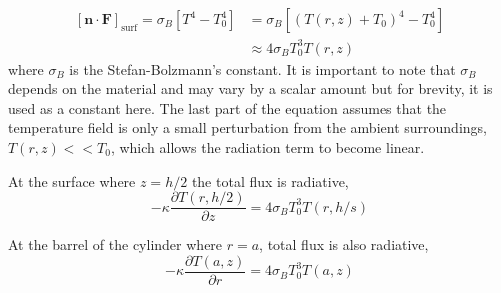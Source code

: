 	\begin{equation}\label{eq:heat_flux}
	\begin{aligned}
	[\textbf{n} \cdot  \textbf{F}]_{\text{surf}} = \sigma_B  [T^4 - T_0^4] 	&= \sigma_B [(T(r,z) + T_0)^4 - T_0^4] \\
																			&\approx 4 \sigma_B T_0^3 T(r,z)
	\end{aligned}
	\end{equation}
	where $\sigma_B$ is the Stefan-Bolzmann's constant.  It is important to note that $\sigma_B$ depends on the material and may vary by a scalar amount but for brevity, it is used as a constant here.  The last part of the equation assumes that the temperature field is only a small perturbation from the ambient surroundings, $T(r,z) << T_0$, which allows the radiation term to become linear.
	
	At the surface where $z=h/2$ the total flux is radiative,
	\begin{equation}\label{eq:faceh2}
	-\kappa \frac{\partial T(r,h/2)}{\partial z} = 4 \sigma_B T_0^3 T(r,h/s)
	\end{equation}
	
	At the barrel of the cylinder where $r=a$, total flux is also radiative,
	\begin{equation}\label{eq:barrel}
	-\kappa \frac{\partial T(a,z)}{\partial r} = 4 \sigma_B  T_0^3 T(a,z)
	\end{equation}
	
